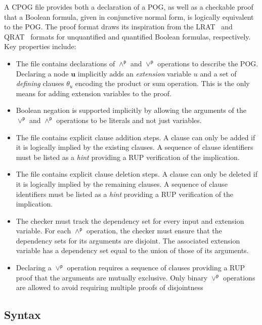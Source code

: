 \documentclass[letterpaper,USenglish,cleveref, autoref, thm-restate]{lipics-v2021}
\newcommand{\pand}{\mathbin{\land^\textsf{p}}}
\newcommand{\por}{\mathbin{\lor^\textsf{p}}}
\newcommand{\makenode}[1]{\mathbf{#1}}
\newcommand{\nodeu}{\makenode{u}}
\begin{document}
A CPOG file provides both a declaration of a POG, as well as a checkable
proof that a Boolean formula, given in conjunctive normal
form, is logically equivalent to the POG\@.
The proof format draws its inspiration from the LRAT~\cite{lrat} and
QRAT~\cite{heule:JAR2014} formats for unquantified and quantified Boolean formulas, respectively.
Key properties include:
\begin{itemize}
  \item
  The file contains declarations of $\pand$ and $\por$ operations to describe the POG.
  Declaring a node $\nodeu$ implicitly adds an \emph{extension} variable $u$ and a set of \emph{defining} clauses $\theta_{u}$
  encoding the product or sum operation.
  This is the only means for adding extension variables to the proof.
\item Boolean negation is supported implicitly by allowing the
  arguments of the $\por$ and $\pand$ operations to be literals and not just
  variables.
\item
  The file contains explicit clause addition steps.
  A clause can only be added if it is logically implied by the existing clauses.
  A sequence of clause identifiers must be listed as a \emph{hint} providing a RUP verification of the implication.
\item
  The file contains explicit clause deletion steps.
  A clause can only be deleted if it is logically implied by the remaining clauses.
  A sequence of clause identifiers must be listed as a \emph{hint} providing a RUP verification of the implication.
\item The checker must track the dependency set for every input and
  extension variable.  For each $\pand$ operation, the checker must ensure that the dependency sets for its arguments are disjoint.
  The associated extension variable has a dependency set equal to the union of those of its arguments.
\item Declaring a $\por$ operation requires a sequence of clauses
  providing a RUP proof that the arguments are mutually exclusive.
  Only binary $\por$ operations are allowed to avoid requiring multiple proofs of disjointness
\end{itemize}

\subsection{Syntax}
\label{subsection:syntax}
\end{document}
